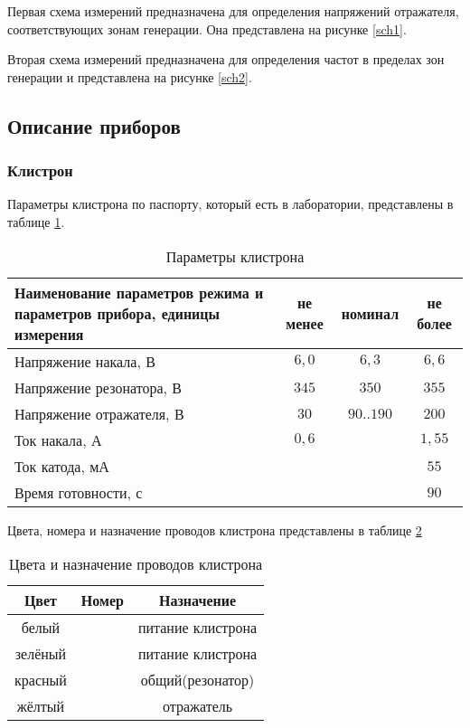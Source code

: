 \documentclass[a4paper]{article}
\begin{document}
	Первая схема измерений предназначена для определения напряжений отражателя, соответствующих зонам генерации. Она представлена на рисунке \ref{sch1}.
	
	Вторая схема измерений предназначена для определения частот в пределах зон генерации и представлена на рисунке \ref{sch2}.
	
	\subsection{Описание приборов}
	\subsubsection{Клистрон}
	
	Параметры клистрона по паспорту, который есть в лаборатории, представлены в таблице \ref{tab1}.
	
	\begin{table}[h]
		\center
		\begin{tabular}{|p{7cm}|c|c|c|}
			\hline
			\centering Наименование параметров режима и параметров прибора, единицы измерения
			& не менее
			& номинал
			& не более \\ \hline
			\centering Напряжение накала, В
			& $6{,}0$
			& $6{,}3$
			& $6{,}6$ \\ \hline
			\centering Напряжение резонатора, В
			& $345$
			& $350$
			& $355$ \\ \hline
			\centering Напряжение отражателя, В
			& $30$
			& $90..190$
			& $200$ \\ \hline
			\centering Ток накала, А
			& $0{,}6$
			& 
			& $1{,}55$ \\ \hline
			\centering Ток катода, мА
			& 
			&
			& $55$ \\ \hline
			\centering Время готовности, с
			&
			&
			& $90$ \\ \hline
		\end{tabular}
		\caption{Параметры клистрона}
		\label{tab1}
	\end{table}
	
	Цвета, номера и назначение проводов клистрона представлены в таблице \ref{tab2}
	\begin{table}[h]
		\center
		\begin{tabular}{|c|c|c|}
			\hline
			Цвет 	& Номер	& Назначение \\ \hline
			белый 	& 		& питание клистрона\\ \hline
			зелёный & 		& питание клистрона\\ \hline
			красный & 		& общий(резонатор)\\ \hline
			жёлтый  & 		& отражатель\\ \hline
		\end{tabular}
		\caption{Цвета и назначение проводов клистрона}
		\label{tab2}
	\end{table}
	
\end{document}

